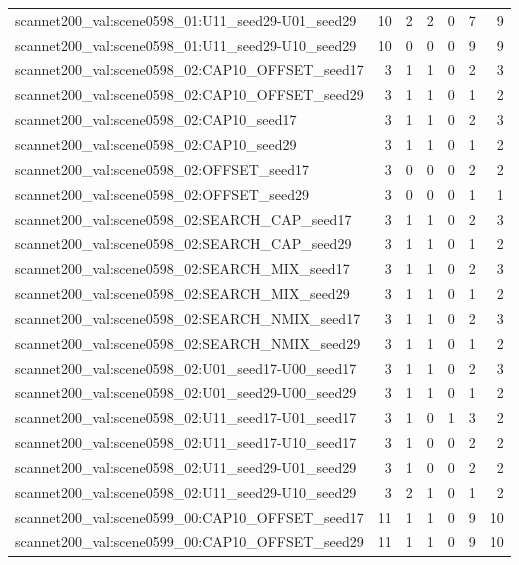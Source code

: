 \begin{table}[t]
\begin{tabular}{lrrrrrr}
scannet200\_val:scene0598\_01:U11\_seed29-U01\_seed29 & 10 & 2 & 2 & 0 & 7 & 9 \\
scannet200\_val:scene0598\_01:U11\_seed29-U10\_seed29 & 10 & 0 & 0 & 0 & 9 & 9 \\
scannet200\_val:scene0598\_02:CAP10\_OFFSET\_seed17 & 3 & 1 & 1 & 0 & 2 & 3 \\
scannet200\_val:scene0598\_02:CAP10\_OFFSET\_seed29 & 3 & 1 & 1 & 0 & 1 & 2 \\
scannet200\_val:scene0598\_02:CAP10\_seed17 & 3 & 1 & 1 & 0 & 2 & 3 \\
scannet200\_val:scene0598\_02:CAP10\_seed29 & 3 & 1 & 1 & 0 & 1 & 2 \\
scannet200\_val:scene0598\_02:OFFSET\_seed17 & 3 & 0 & 0 & 0 & 2 & 2 \\
scannet200\_val:scene0598\_02:OFFSET\_seed29 & 3 & 0 & 0 & 0 & 1 & 1 \\
scannet200\_val:scene0598\_02:SEARCH\_CAP\_seed17 & 3 & 1 & 1 & 0 & 2 & 3 \\
scannet200\_val:scene0598\_02:SEARCH\_CAP\_seed29 & 3 & 1 & 1 & 0 & 1 & 2 \\
scannet200\_val:scene0598\_02:SEARCH\_MIX\_seed17 & 3 & 1 & 1 & 0 & 2 & 3 \\
scannet200\_val:scene0598\_02:SEARCH\_MIX\_seed29 & 3 & 1 & 1 & 0 & 1 & 2 \\
scannet200\_val:scene0598\_02:SEARCH\_NMIX\_seed17 & 3 & 1 & 1 & 0 & 2 & 3 \\
scannet200\_val:scene0598\_02:SEARCH\_NMIX\_seed29 & 3 & 1 & 1 & 0 & 1 & 2 \\
scannet200\_val:scene0598\_02:U01\_seed17-U00\_seed17 & 3 & 1 & 1 & 0 & 2 & 3 \\
scannet200\_val:scene0598\_02:U01\_seed29-U00\_seed29 & 3 & 1 & 1 & 0 & 1 & 2 \\
scannet200\_val:scene0598\_02:U11\_seed17-U01\_seed17 & 3 & 1 & 0 & 1 & 3 & 2 \\
scannet200\_val:scene0598\_02:U11\_seed17-U10\_seed17 & 3 & 1 & 0 & 0 & 2 & 2 \\
scannet200\_val:scene0598\_02:U11\_seed29-U01\_seed29 & 3 & 1 & 0 & 0 & 2 & 2 \\
scannet200\_val:scene0598\_02:U11\_seed29-U10\_seed29 & 3 & 2 & 1 & 0 & 1 & 2 \\
scannet200\_val:scene0599\_00:CAP10\_OFFSET\_seed17 & 11 & 1 & 1 & 0 & 9 & 10 \\
scannet200\_val:scene0599\_00:CAP10\_OFFSET\_seed29 & 11 & 1 & 1 & 0 & 9 & 10 \\

\end{tabular}
\end{table}
